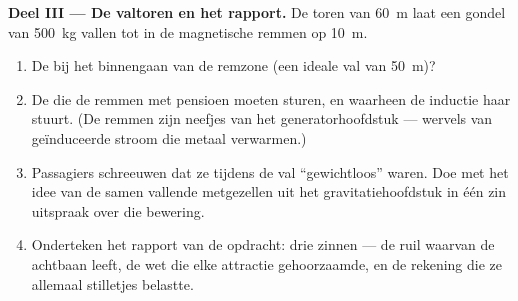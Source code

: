 \begin{problem}
\medskip\noindent\textbf{Deel III --- De valtoren en het rapport.}
De toren van \qty{60}{m} laat een gondel van \qty{500}{kg} vallen tot
in de magnetische remmen op \qty{10}{m}.
\begin{enumerate}[resume]
  \item De  bij het binnengaan van de remzone (een ideale
        val van \qty{50}{m})?
  \item De  die de remmen met pensioen moeten sturen, en
        waarheen de inductie haar stuurt. (De remmen zijn neefjes van
        het generatorhoofdstuk --- wervels van geïnduceerde stroom
        die metaal verwarmen.)
  \item Passagiers schreeuwen dat ze tijdens de val ``gewichtloos''
        waren. Doe met het idee van de samen vallende metgezellen uit
        het gravitatiehoofdstuk in één zin uitspraak over die
        bewering.
  \item Onderteken het rapport van de opdracht: drie zinnen --- de ruil
        waarvan de achtbaan leeft, de wet die elke attractie
        gehoorzaamde, en de rekening die ze allemaal stilletjes
        belastte.
\end{enumerate}
\end{problem}
